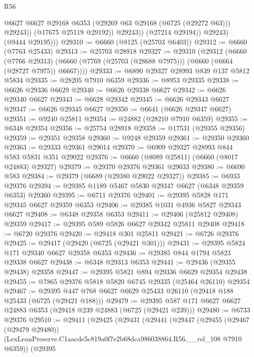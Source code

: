 \begin{lexlean}{R56}
\begin{coremodule}
                      @6627
                      @6627
                      @29168
                      @6353
                      (@29269 @63 @29168 (@6725 (@29272 @63)))
                      @29243))
                  (@17675 @25119 @29192))
                @29243))
            (@27214 @29194))
          @29243)
        (@9444 @29195)))
@29310 := @6660 (@8125 (@25703 @6403))
@29312 := @6660 (@7763 @25433)
@29313 := @25703 @28918
@29327 := @29310
    (@29312
      (@6660
        (@7766 @29313)
        (@6660 (@7769 (@25703 (@28688 @7975))) (@6660 (@6664 (@28727 @7975)) @6667))))
@29333 := @6890 @29327 @28993 @839 @137 @5812 @5834
@29335 := @28205 @7910 @6359
@29336 := @8953 @29335
@29338 := @6626 @29336 @6629
@29340 := @6626 @29338 @6627
@29342 := @6626 @29340 @6627
@29343 := @6628 @29342
@29345 := @6626 @29343 @6627
@29347 := @6626 @29345 @6627
@29350 := @6641 (@6626 @29347 @6627)
@29351 := @9240 @25811
@29354 := @24882 (@28210 @7910 @6359)
@29355 := @6348 @29354
@29356 := @25754 @28918
@29358 := @17531 (@29355 @29356)
@29359 := @29351 @29358
@29360 := @9248 @29359
@29361 := @29350 @29360
@29363 := @29333 @29361 @29014
@29370 := @6909 @29327 @28993 @844 @583 @5831 @351 @29022
@29376 := @6660 (@8089 @25811) (@6660 (@8017 @24883) @29327)
@29379 := @29370 @29376 @29361 @29033
@29380 := @6690 @583
@29384 := @29379 (@6689 (@29380 @29022 @29327))
@29385 := @6933 @29376
@29394 := @29385 @1189 @5467 @5830 @29347 @6627 (@6348 @29359 @6353) @29360
@29395 := @6711 @29376
@29401 := @29395 @5828 @171 @29345 @6627 @29359 @6353
@29406 := @29385 @1031 @4936 @5827 @29343 @6627
@29408 := @6348 @29358 @6353
@29411 := @29406 (@25812 @29408) @29359
@29417 := @29395 @589 @5826 @6627 @29342 @25811 @29408
@29418 := @6720 @29376
@29420 := @29418 @301 @25811
@29421 := @6726 @29376
@29425 := @29417 (@29420 (@6725 (@29421 @301)))
@29431 := @29395 @5824 @171 @29340 @6627 @29358 @6353
@29436 := @29385 @844 @1794 @5823 @29338 @6627
@29438 := @6348 @29313 @6353
@29441 := @29436 (@29355 @29438) @29358
@29447 := @29395 @5821 @894 @29336 @6629 @29354 @29438
@29455 := @7865 @29376 @5818 @5820 @6745 @29335 (@25464 @26110) @29354
@29467 := @29395 @447 @768 @6627 @6629 @25433 @26110 (@29418 @188 @25433 (@6725 (@29421 @188)))
@29479 := @29395 @587 @171 @6627 @6627 @24883 @6353 (@29418 @239 @24883 (@6725 (@29421 @239)))
@29480 := @6733 @29376
@29510 := @29411
    (@29425
      (@29431
        (@29441
          (@29447
            (@29455
              (@29467 (@29479 @29480))
              (LexLeanPreserve.C1aacde5c819a0f7e2b68dca986038864.R56.__rel_108 @7910 @6359))
            (@29395

\end{coremodule}
\end{lexlean}
